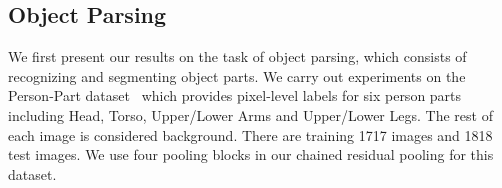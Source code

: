 \documentclass[10pt,twocolumn,letterpaper]{article}
\begin{document}
\subsection{Object Parsing}\label{sec:object-parsing}\begin{table}[t]
\caption{Object parsing results on the Person-Part dataset.
Our method achieves the best performance (bold).
}
\centering
{}
\label{tab:personpart}
\end{table}\begin{table}[t]
\caption{Ablation experiments on NYUDv2 and Person-Part.
}
\centering
{}
\label{tab:nyud_ablation}
\end{table}We first present our results on the task of object parsing, which consists of recognizing and segmenting object parts.
We carry out experiments on the Person-Part dataset~\cite{chen2014detect,chen2015attention} which provides pixel-level labels for six person parts including
Head, Torso, Upper/Lower Arms and Upper/Lower Legs. The rest of each image is considered background. There are training 1717 images and 1818 test images.
We use four pooling blocks in our chained residual pooling for this dataset.
\end{document}
